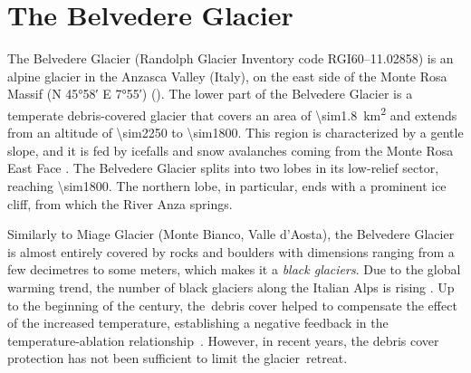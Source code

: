 \section{The Belvedere Glacier}\label{sec:1:belvedereglacier}

The Belvedere Glacier (Randolph Glacier Inventory code RGI60--11.02858) is an alpine
glacier in the Anzasca Valley (Italy), on the east side of the Monte Rosa Massif (N
\ang{45;58} E \ang{7;55}) ().
The lower part of the Belvedere Glacier is a temperate debris-covered glacier that
covers an area of \SI{\sim1.8}{\kilo\meter\squared} and extends from an altitude of \SI{\sim2250}{\masl} to \SI{\sim1800}{\masl}.
This region is characterized by a gentle slope, and it is fed by icefalls and snow
avalanches coming from the Monte Rosa East Face \citep{Haeberli2002}. 
The Belvedere Glacier splits into two lobes in its low-relief sector, reaching \SI{\sim1800}{\masl}.
The northern lobe, in particular, ends with a prominent ice cliff, from which the River
Anza springs.

Similarly to Miage Glacier (Monte Bianco, Valle d’Aosta), the Belvedere Glacier is almost entirely covered by rocks and boulders with dimensions ranging from a few decimetres to
some meters, which makes it a \textit{black glaciers}.
Due to the global warming trend, the number of black glaciers along the Italian Alps is
rising \citep{Diolaiuti2003}.
Up to the beginning of the century, the~debris cover helped to compensate the effect of
the increased temperature, establishing a negative feedback in the temperature-ablation
relationship~\citep{Roethlisberger1985,Diolaiuti2003}.
However, in recent years, the debris cover protection has not been sufficient to limit
the glacier~retreat.

